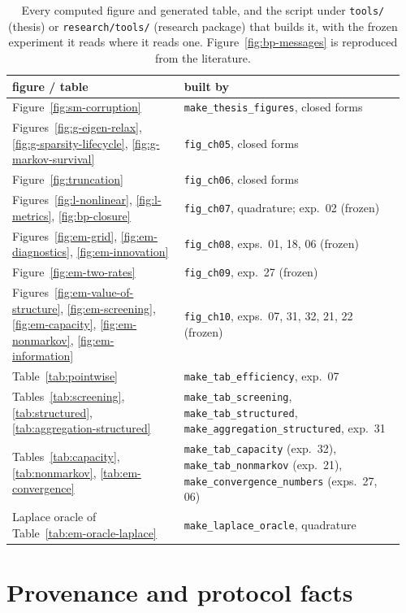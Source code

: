 \begin{table}[tbp]\small\centering
\caption[Figure-to-code map]{Every computed figure and generated
table, and the script under \texttt{tools/} (thesis) or
\texttt{research/tools/} (research package) that builds it, with the frozen
experiment it reads where it reads one. Figure~\ref{fig:bp-messages} is
reproduced from the literature.}
\label{tab:figure-map}
\setlength{\tabcolsep}{4pt}
\begin{tabular}{@{}p{0.42\linewidth}p{0.54\linewidth}@{}}
\toprule
figure / table & built by \\
\midrule
Figure~\ref{fig:sm-corruption} & \texttt{make\_thesis\_figures}, closed forms \\
Figures~\ref{fig:g-eigen-relax}, \ref{fig:g-sparsity-lifecycle}, \ref{fig:g-markov-survival} & \texttt{fig\_ch05}, closed forms \\
Figure~\ref{fig:truncation} & \texttt{fig\_ch06}, closed forms \\
Figures~\ref{fig:l-nonlinear}, \ref{fig:l-metrics}, \ref{fig:bp-closure} & \texttt{fig\_ch07}, quadrature; exp.~02 (frozen) \\
Figures~\ref{fig:em-grid}, \ref{fig:em-diagnostics}, \ref{fig:em-innovation} & \texttt{fig\_ch08}, exps.~01, 18, 06 (frozen) \\
Figure~\ref{fig:em-two-rates} & \texttt{fig\_ch09}, exp.~27 (frozen) \\
Figures~\ref{fig:em-value-of-structure}, \ref{fig:em-screening}, \ref{fig:em-capacity}, \ref{fig:em-nonmarkov}, \ref{fig:em-information} & \texttt{fig\_ch10}, exps.~07, 31, 32, 21, 22 (frozen) \\
Table~\ref{tab:pointwise} & \texttt{make\_tab\_efficiency}, exp.~07 \\
Tables~\ref{tab:screening}, \ref{tab:structured}, \ref{tab:aggregation-structured} & \texttt{make\_tab\_screening}, \texttt{make\_tab\_structured}, \texttt{make\_aggregation\_structured}, exp.~31 \\
Tables~\ref{tab:capacity}, \ref{tab:nonmarkov}, \ref{tab:em-convergence} & \texttt{make\_tab\_capacity} (exp.~32), \texttt{make\_tab\_nonmarkov} (exp.~21), \texttt{make\_convergence\_numbers} (exps.~27, 06) \\
Laplace oracle of Table~\ref{tab:em-oracle-laplace} & \texttt{make\_laplace\_oracle}, quadrature \\
\bottomrule
\end{tabular}
\end{table}

\section{Provenance and protocol facts}\label{sec:repro-provenance}\label{sec:repro-learning}

